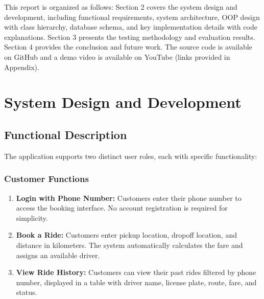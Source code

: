 \documentclass[fonts]{icst}
\begin{document}
This report is organized as follows: Section 2 covers the system design and development, including functional requirements, system architecture, OOP design with class hierarchy, database schema, and key implementation details with code explanations. Section 3 presents the testing methodology and evaluation results. Section 4 provides the conclusion and future work. The source code is available on GitHub and a demo video is available on YouTube (links provided in Appendix).


\section{System Design and Development}\label{sec:design}

\subsection{Functional Description}

The application supports two distinct user roles, each with specific functionality:

\subsubsection{Customer Functions}
\begin{enumerate}
    \item \textbf{Login with Phone Number:} Customers enter their phone number to access the booking interface. No account registration is required for simplicity.
    \item \textbf{Book a Ride:} Customers enter pickup location, dropoff location, and distance in kilometers. The system automatically calculates the fare and assigns an available driver.
    \item \textbf{View Ride History:} Customers can view their past rides filtered by phone number, displayed in a table with driver name, license plate, route, fare, and status.
\end{enumerate}
\end{document}
